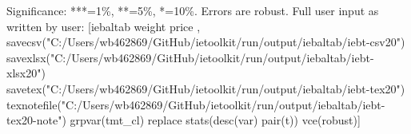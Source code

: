 Significance: ***=1\%, **=5\%, *=10\%. Errors are robust. Full user input as written by user: [iebaltab weight price , savecsv("C:/Users/wb462869/GitHub/ietoolkit/run/output/iebaltab/iebt-csv20") savexlsx("C:/Users/wb462869/GitHub/ietoolkit/run/output/iebaltab/iebt-xlsx20") savetex("C:/Users/wb462869/GitHub/ietoolkit/run/output/iebaltab/iebt-tex20") texnotefile("C:/Users/wb462869/GitHub/ietoolkit/run/output/iebaltab/iebt-tex20-note") grpvar(tmt\_cl) replace stats(desc(var) pair(t)) vce(robust)]
